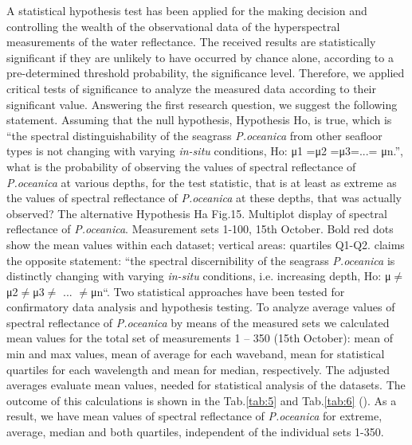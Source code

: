 \documentclass[10pt, a4paper]{article}
\begin{document}
A statistical hypothesis test has been applied for the making decision and controlling the wealth of the
observational data of the hyperspectral measurements of the water reflectance.
The received results are statistically significant if they are unlikely to have occurred by chance alone,
according to a pre-determined threshold probability, the significance level. Therefore, we applied
critical tests of significance to analyze the measured data according to their significant value.
Answering the first research question, we suggest the following statement.
Assuming that the null hypothesis, Hypothesis Ho, is true, which is “the spectral distinguishability of
the seagrass \textit{P.oceanica} from other seafloor types is not changing with varying \textit{in-situ} conditions,
Ho: μ1 =μ2 =μ3=...= μn.”, what is the probability of observing the values of spectral reflectance of
\textit{P.oceanica} at various depths, for the test statistic, that is at least as extreme as the values of spectral
reflectance of \textit{P.oceanica} at these depths, that was actually observed? The alternative Hypothesis Ha
Fig.15. Multiplot display of spectral reflectance of \textit{P.oceanica}. Measurement sets 1-100, 15th
October. Bold red dots show the mean values within each dataset; vertical areas: quartiles Q1-Q2.
claims the opposite statement: “the spectral discernibility of the seagrass \textit{P.oceanica} is distinctly
changing with varying \textit{in-situ} conditions, i.e. increasing depth, Ho: μ$\neq$μ2$\neq$μ3$\neq$ ... $\neq$μn“.
Two statistical approaches have been tested for confirmatory data analysis and hypothesis testing.
To analyze average values of spectral reflectance of \textit{P.oceanica} by means of the measured sets we calculated 
mean values for the total set of measurements 1 – 350 (15th October): mean of min and max values, 
mean of average for each waveband, mean for statistical quartiles for each wavelength and mean for median, respectively. 
The adjusted averages evaluate mean values, needed for statistical analysis of the datasets. 
The outcome of this calculations is shown in the Tab.\ref{tab:5} and Tab.\ref{tab:6} (). 
As a result, we have mean values of spectral reflectance of \textit{P.oceanica} for extreme, average, median and both quartiles,
independent of the individual sets 1-350. 
\end{document}
